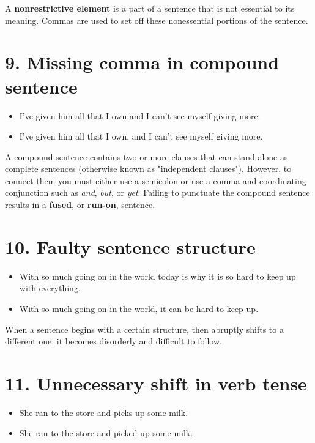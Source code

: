 \noindent A \textbf{nonrestrictive element} is a part of a sentence that is not essential to its
meaning. Commas are used to set off these nonessential portions of the
sentence.


\section{9. Missing comma in compound sentence} 

\begin{itemize}
\item I've given him all that I own and I can't see myself giving more. 

\item I've given him all that I own, and I can't see myself giving more. 
\end{itemize}

\noindent A compound sentence contains two or more clauses that can stand alone as
complete sentences (otherwise known as "independent clauses"). However,
to connect them you must either use a semicolon or use a comma and
coordinating conjunction such as \emph{and}, \emph{but}, or \emph{yet}. Failing
to punctuate the compound sentence results in a \textbf{fused}, or \textbf{run-on}, sentence.


\section{10. Faulty sentence structure} 
\begin{itemize}
\item With so much going on in the world today is why it is so hard to 
keep up with everything. 

\item With so much going on in the world, it can be hard to keep up. 
\end{itemize}

\noindent When a sentence begins with a certain structure, then abruptly shifts to a different
one, it becomes disorderly and difficult to follow. 



\section{11. Unnecessary shift in verb tense} 
\begin{itemize}
\item She ran to the store and picks up some milk. 

\item She ran to the store and picked up some milk. 
\end{itemize}

